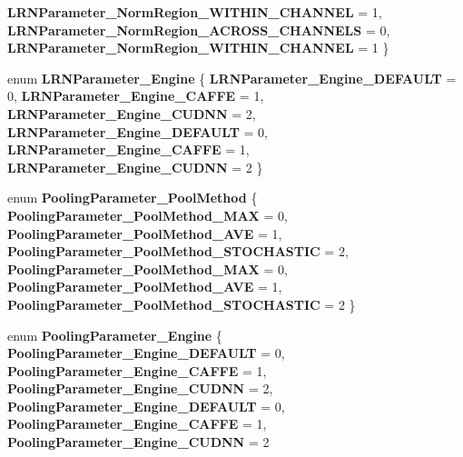 \begin{DoxyCompactItemize}
{\bfseries L\+R\+N\+Parameter\+\_\+\+Norm\+Region\+\_\+\+W\+I\+T\+H\+I\+N\+\_\+\+C\+H\+A\+N\+N\+EL} = 1, 
{\bfseries L\+R\+N\+Parameter\+\_\+\+Norm\+Region\+\_\+\+A\+C\+R\+O\+S\+S\+\_\+\+C\+H\+A\+N\+N\+E\+LS} = 0, 
{\bfseries L\+R\+N\+Parameter\+\_\+\+Norm\+Region\+\_\+\+W\+I\+T\+H\+I\+N\+\_\+\+C\+H\+A\+N\+N\+EL} = 1
 \}
\item 
\mbox{\label{namespacecaffe_a35b24282cbcf2c10881b8f246a74ca87}} 
enum {\bfseries L\+R\+N\+Parameter\+\_\+\+Engine} \{ \newline
{\bfseries L\+R\+N\+Parameter\+\_\+\+Engine\+\_\+\+D\+E\+F\+A\+U\+LT} = 0, 
{\bfseries L\+R\+N\+Parameter\+\_\+\+Engine\+\_\+\+C\+A\+F\+FE} = 1, 
{\bfseries L\+R\+N\+Parameter\+\_\+\+Engine\+\_\+\+C\+U\+D\+NN} = 2, 
{\bfseries L\+R\+N\+Parameter\+\_\+\+Engine\+\_\+\+D\+E\+F\+A\+U\+LT} = 0, 
\newline
{\bfseries L\+R\+N\+Parameter\+\_\+\+Engine\+\_\+\+C\+A\+F\+FE} = 1, 
{\bfseries L\+R\+N\+Parameter\+\_\+\+Engine\+\_\+\+C\+U\+D\+NN} = 2
 \}
\item 
\mbox{\label{namespacecaffe_a41737a31f35a993565575ca16671a9d7}} 
enum {\bfseries Pooling\+Parameter\+\_\+\+Pool\+Method} \{ \newline
{\bfseries Pooling\+Parameter\+\_\+\+Pool\+Method\+\_\+\+M\+AX} = 0, 
{\bfseries Pooling\+Parameter\+\_\+\+Pool\+Method\+\_\+\+A\+VE} = 1, 
{\bfseries Pooling\+Parameter\+\_\+\+Pool\+Method\+\_\+\+S\+T\+O\+C\+H\+A\+S\+T\+IC} = 2, 
{\bfseries Pooling\+Parameter\+\_\+\+Pool\+Method\+\_\+\+M\+AX} = 0, 
\newline
{\bfseries Pooling\+Parameter\+\_\+\+Pool\+Method\+\_\+\+A\+VE} = 1, 
{\bfseries Pooling\+Parameter\+\_\+\+Pool\+Method\+\_\+\+S\+T\+O\+C\+H\+A\+S\+T\+IC} = 2
 \}
\item 
\mbox{\label{namespacecaffe_ae961d14813c949ad9e888ef13b18aa22}} 
enum {\bfseries Pooling\+Parameter\+\_\+\+Engine} \{ \newline
{\bfseries Pooling\+Parameter\+\_\+\+Engine\+\_\+\+D\+E\+F\+A\+U\+LT} = 0, 
{\bfseries Pooling\+Parameter\+\_\+\+Engine\+\_\+\+C\+A\+F\+FE} = 1, 
{\bfseries Pooling\+Parameter\+\_\+\+Engine\+\_\+\+C\+U\+D\+NN} = 2, 
{\bfseries Pooling\+Parameter\+\_\+\+Engine\+\_\+\+D\+E\+F\+A\+U\+LT} = 0, 
\newline
{\bfseries Pooling\+Parameter\+\_\+\+Engine\+\_\+\+C\+A\+F\+FE} = 1, 
{\bfseries Pooling\+Parameter\+\_\+\+Engine\+\_\+\+C\+U\+D\+NN} = 2

\end{DoxyCompactItemize}
